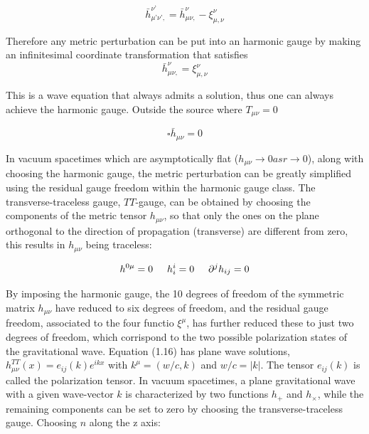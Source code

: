 \documentclass[binding=0.6cm, LaM]{sapthesis}
\begin{document}
\begin{equation}
{\bar h}_{\mu’\nu’,} ^{\nu’} = {\bar h}_{\mu\nu,} ^{\nu} - \xi_{\mu,\nu}^{\nu}
\end{equation}

Therefore any metric perturbation can be put into an harmonic gauge by making an infinitesimal coordinate transformation that satisfies 
\begin{equation}
{\bar h}_{\mu\nu,} ^{\nu} = \xi_{\mu,\nu}^{\nu}
\end{equation}

This is a wave equation that always admits a solution, thus one can always achieve the harmonic gauge. 
Outside the source where $T_{\mu\nu} = 0$ 

\begin{equation}
\square {\bar h}_{\mu\nu} = 0
\end{equation}

In vacuum spacetimes which are asymptotically flat ($h_{\mu\nu} \rightarrow 0 as r \rightarrow 0$), along with choosing the harmonic gauge, the metric perturbation can be greatly simplified using 
the residual gauge freedom within the harmonic gauge class. The transverse-traceless gauge,  $TT$-gauge, can be obtained by choosing the components of the metric tensor $h_{\mu\nu}$, 
so that only the ones on the plane orthogonal to the direction of propagation (transverse) are different from zero, this results in $h_{\mu\nu}$ being traceless:

\begin{equation}
h^{0\mu} = 0 \hspace*{0.5cm}  h^{i}_i = 0  \hspace*{0.5cm}   {\partial}^jh_{ij} = 0
\end{equation}

By imposing the harmonic gauge, the 10 degrees of freedom of the symmetric matrix $h_{\mu\nu}$ have reduced to six degrees of freedom, and the residual gauge freedom, 
associated to the four functio $\xi^{\mu}$, has further reduced these to just two degrees of freedom, which corrispond to the two possible polarization states of the gravitational wave. 
Equation (1.16) has plane wave solutions, $h_{\mu\nu}^{TT}(x)=e_{ij}(k)e^{ikx}$ with $k^{\mu}=(w/c,k)$ and $w/c=|k|$. The tensor $e_{ij}(k)$ is called the polarization tensor. 
In vacuum spacetimes, a plane gravitational wave with a given wave-vector $k$ is characterized by two functions $h_+$ and $h_{\times}$, while the remaining components can be set to zero by 
choosing the transverse-traceless gauge. Choosing $n$ along the z axis:
\end{document}
